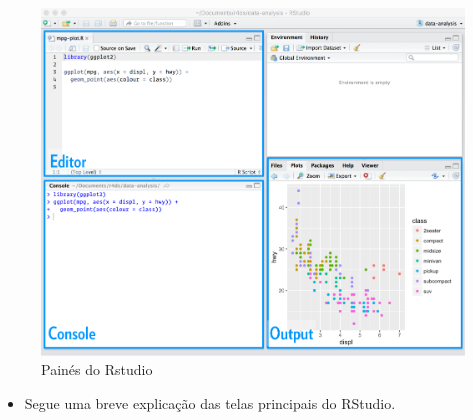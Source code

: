 \documentclass[
  letterpaper,
  DIV=11,
  numbers=noendperiod]{scrartcl}
\providecommand{\tightlist}{%
  \setlength{\itemsep}{0pt}\setlength{\parskip}{0pt}}\usepackage{longtable,booktabs,array}
\begin{document}
\begin{figure}[H]

{\centering \includegraphics{Figuras/panel.png}

}

\caption{Painés do Rstudio}

\end{figure}%

\begin{itemize}
\tightlist
\item
  Segue uma breve explicação das telas principais do RStudio.
\end{itemize}
\end{document}
